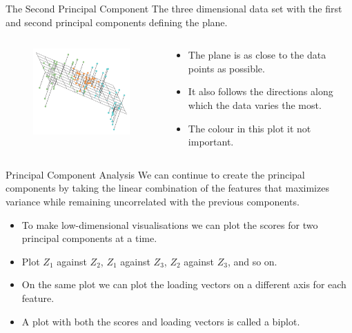 \documentclass[
  ignorenonframetext,
  aspectratio=169,
]{beamer}
\begin{document}
\begin{frame}{The Second Principal Component}
\protect\hypertarget{the-second-principal-component-2}{}
The three dimensional data set with the first and second principal
components defining the plane.

\begin{columns}[T]
\begin{column}{0.5\textwidth}
\begin{figure}

{\centering \includegraphics[width=2.92708in,height=\textheight]{images/second_component3D.png}

}

\end{figure}
\end{column}

\begin{column}{0.5\textwidth}
\begin{itemize}
\item
  The plane is as close to the data points as possible.
\item
  It also follows the directions along which the data varies the most.
\item
  The colour in this plot it not important.
\end{itemize}
\end{column}
\end{columns}
\end{frame}

\begin{frame}{Principal Component Analysis}
\protect\hypertarget{principal-component-analysis-1}{}
We can continue to create the principal components by taking the linear
combination of the features that maximizes variance while remaining
uncorrelated with the previous components.

\begin{itemize}
\item
  To make low-dimensional visualisations we can plot the scores for two
  principal components at a time.
\item
  Plot \(Z_1\) against \(Z_2\), \(Z_1\) against \(Z_3\), \(Z_2\) against
  \(Z_3\), and so on.
\item
  On the same plot we can plot the loading vectors on a different axis
  for each feature.
\item
  A plot with both the scores and loading vectors is called a biplot.
\end{itemize}
\end{frame}
\end{document}
